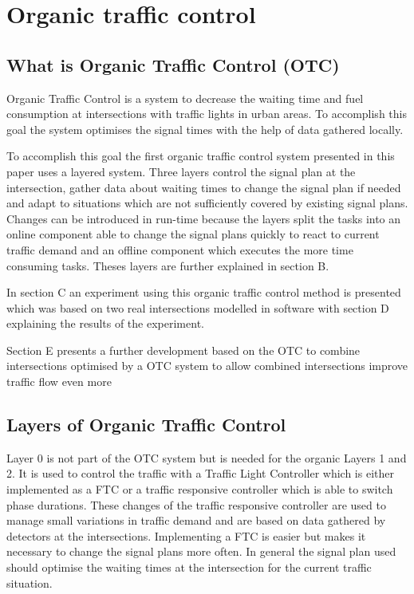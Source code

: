 \section{Organic traffic control}

\subsection{What is Organic Traffic Control (OTC)}

Organic Traffic Control is a system to decrease the waiting time and fuel consumption at
intersections with traffic lights in urban areas. To accomplish this goal the system optimises the
signal times with the help of data gathered locally.

To accomplish this goal the first organic traffic control system presented in this paper uses a layered system. Three layers control the signal plan at the intersection, gather data about waiting times to change the signal plan if needed and adapt to situations which are not sufficiently covered by existing signal plans. Changes can be introduced in run-time because the layers split the tasks into an online component able to change the signal plans quickly to react to current traffic demand and an offline component which executes the more time consuming tasks.  Theses layers are further explained in section B.

In section C an experiment using this organic traffic control method is presented which was based on two real intersections modelled in software with section D explaining the results of the experiment.

Section E presents a further development based on the OTC to combine intersections optimised by a OTC system to allow combined intersections improve traffic flow even more

\subsection{Layers of Organic Traffic Control}
Layer 0
 is not part of the OTC system but is needed for the organic Layers 1 and 2. It is used to control the traffic with a Traffic Light Controller which is either implemented as a FTC or a traffic responsive controller which is able to switch phase durations. These changes of the traffic responsive controller are used to manage small variations in traffic demand and are based on data gathered by detectors at the intersections. Implementing a FTC is easier but makes it necessary to change the signal plans more often. In general the signal plan used should optimise the waiting times at the intersection for the current traffic situation.
 
